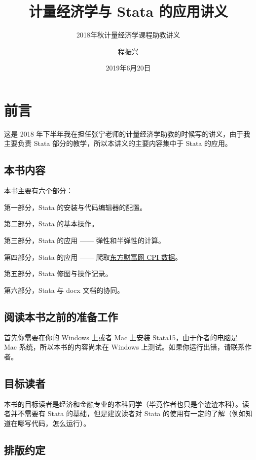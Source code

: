 \documentclass[cn,fancy,blue,11pt]{elegantbook}
\title{计量经济学与 Stata 的应用讲义}
\subtitle{2018年秋计量经济学课程助教讲义}
\author{程振兴}
\institute{https://www.czxa.top}
\date{2019年6月20日}
\begin{document}
\maketitle
\tableofcontents

\mainmatter
\hypersetup{pageanchor=true}

\hypertarget{section}{%
\chapter{前言}\label{section}}

这是 2018 年下半年我在担任张宁老师的计量经济学助教的时候写的讲义，由于我主要负责 Stata 部分的教学，所以本讲义的主要内容集中于 Stata 的应用。

\hypertarget{section-1}{%
\section{本书内容}\label{section-1}}

本书主要有六个部分：

第一部分，Stata 的安装与代码编辑器的配置。

第二部分，Stata 的基本操作。

第三部分，Stata 的应用 ------ 弹性和半弹性的计算。

第四部分，Stata 的应用 ------ 爬取\href{http://data.eastmoney.com/cjsj/cpi.html}{东方财富网 CPI 数据}。

第五部分，Stata 修图与操作记录。

第六部分，Stata 与 docx 文档的协同。

\hypertarget{section-2}{%
\section{阅读本书之前的准备工作}\label{section-2}}

首先你需要在你的 Windows 上或者 Mac 上安装 Stata15，由于作者的电脑是 Mac 系统，所以本书的内容尚未在 Windows 上测试。如果你运行出错，请联系作者。

\hypertarget{section-3}{%
\section{目标读者}\label{section-3}}

本书的目标读者是经济和金融专业的本科同学（毕竟作者也只是个渣渣本科）。读者并不需要有 Stata 的基础，但是建议读者对 Stata 的使用有一定的了解（例如知道在哪写代码，怎么运行）。

\hypertarget{section-4}{%
\section{排版约定}\label{section-4}}
\end{document}

